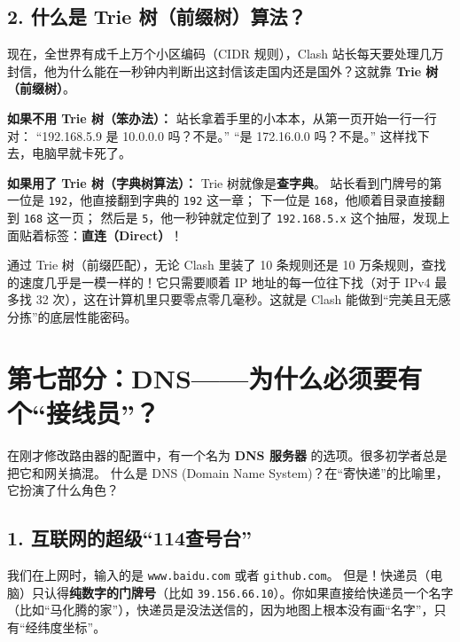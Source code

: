 \documentclass[12pt,a4paper]{ctexart}
\begin{document}
\subsection{2. 什么是 Trie 树（前缀树）算法？}

现在，全世界有成千上万个小区编码（CIDR 规则），Clash 站长每天要处理几万封信，他为什么能在一秒钟内判断出这封信该走国内还是国外？这就靠 \textbf{Trie 树（前缀树）}。

\textbf{如果不用 Trie 树（笨办法）：}
站长拿着手里的小本本，从第一页开始一行一行对：
“192.168.5.9 是 10.0.0.0 吗？不是。”
“是 172.16.0.0 吗？不是。”
这样找下去，电脑早就卡死了。

\textbf{如果用了 Trie 树（字典树算法）：}
Trie 树就像是\textbf{查字典}。
站长看到门牌号的第一位是 \texttt{192}，他直接翻到字典的 \texttt{192} 这一章；
下一位是 \texttt{168}，他顺着目录直接翻到 \texttt{168} 这一页；
然后是 \texttt{5}，他一秒钟就定位到了 \texttt{192.168.5.x} 这个抽屉，发现上面贴着标签：\textbf{直连（Direct）}！

\begin{tcolorbox}[colback=blue!5,colframe=blue!75!black,title=Trie 树的威力,fonttitle=\bfseries,boxrule=0.5pt,arc=3mm]
通过 Trie 树（前缀匹配），无论 Clash 里装了 10 条规则还是 10 万条规则，查找的速度几乎是一模一样的！它只需要顺着 IP 地址的每一位往下找（对于 IPv4 最多找 32 次），这在计算机里只要零点零几毫秒。这就是 Clash 能做到“完美且无感分拣”的底层性能密码。
\end{tcolorbox}

\newpage
\section{第七部分：DNS——为什么必须要有个“接线员”？}

在刚才修改路由器的配置中，有一个名为 \textbf{DNS 服务器} 的选项。很多初学者总是把它和网关搞混。
什么是 DNS (Domain Name System)？在“寄快递”的比喻里，它扮演了什么角色？

\subsection{1. 互联网的超级“114查号台”}

我们在上网时，输入的是 \texttt{www.baidu.com} 或者 \texttt{github.com}。
但是！快递员（电脑）只认得\textbf{纯数字的门牌号}（比如 \texttt{39.156.66.10}）。你如果直接给快递员一个名字（比如“马化腾的家”），快递员是没法送信的，因为地图上根本没有画“名字”，只有“经纬度坐标”。
\end{document}
